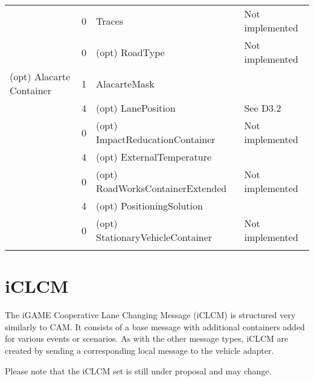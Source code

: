 \documentclass[11pt]{article}
\begin{document}
\begin{center}
\begin{tabular}{lrll}
 & 0 & Traces & Not implemented\\
 & 0 & (opt) RoadType & Not implemented\\
\hline
(opt) Alacarte Container & 1 & AlacarteMask & \\
 & 4 & (opt) LanePosition & See D3.2\\
 & 0 & (opt) ImpactReducationContainer & Not implemented\\
 & 4 & (opt) ExternalTemperature & \\
 & 0 & (opt) RoadWorksContainerExtended & Not implemented\\
 & 4 & (opt) PositioningSolution & \\
 & 0 & (opt) StationaryVehicleContainer & Not implemented\\
 &  &  & \\
\end{tabular}
\end{center}
\newpage

\section{iCLCM}
\label{sec:orgheadline4}
The iGAME Cooperative Lane Changing Message (iCLCM) is structured very
similarly to CAM. It consists of a base message with additional
containers added for various events or scenarios. As with the other
message types, iCLCM are created by sending a corresponding local
message to the vehicle adapter.

Please note that the iCLCM set is still under proposal and may change.
\end{document}
